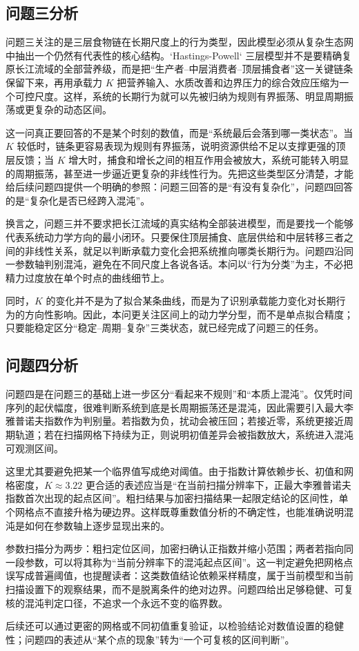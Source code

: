 \subsection{问题三分析}
问题三关注的是三层食物链在长期尺度上的行为类型，因此模型必须从复杂生态网中抽出一个仍然有代表性的核心结构。`Hastings-Powell` 三层模型并不是要精确复原长江流域的全部营养级，而是把“生产者--中层消费者--顶层捕食者”这一关键链条保留下来，再用承载力 \(K\) 把营养输入、水质改善和边界压力的综合效应压缩为一个可控尺度。这样，系统的长期行为就可以先被归纳为规则有界振荡、明显周期振荡或更复杂的动态区间。

这一问真正要回答的不是某个时刻的数值，而是“系统最后会落到哪一类状态”。当 \(K\) 较低时，链条更容易表现为规则有界振荡，说明资源供给不足以支撑更强的顶层反馈；当 \(K\) 增大时，捕食和增长之间的相互作用会被放大，系统可能转入明显的周期振荡，甚至进一步逼近更复杂的非线性行为。先把这些类型区分清楚，才能给后续问题四提供一个明确的参照：问题三回答的是“有没有复杂化”，问题四回答的是“复杂化是否已经跨入混沌”。

换言之，问题三并不要求把长江流域的真实结构全部装进模型，而是要找一个能够代表系统动力学方向的最小闭环。只要保住顶层捕食、底层供给和中层转移三者之间的非线性关系，就足以判断承载力变化会把系统推向哪类长期行为。问题四沿同一参数轴判别混沌，避免在不同尺度上各说各话。本问以“行为分类”为主，不必把精力过度放在单个时点的曲线细节上。

同时，\(K\) 的变化并不是为了拟合某条曲线，而是为了识别承载能力变化对长期行为的方向性影响。因此，本问更关注区间上的动力学分型，而不是单点拟合精度；只要能稳定区分“稳定--周期--复杂”三类状态，就已经完成了问题三的任务。

\subsection{问题四分析}
问题四是在问题三的基础上进一步区分“看起来不规则”和“本质上混沌”。仅凭时间序列的起伏幅度，很难判断系统到底是长周期振荡还是混沌，因此需要引入最大李雅普诺夫指数作为判别量。若指数为负，扰动会被压回；若接近零，系统更接近周期轨道；若在扫描网格下持续为正，则说明初值差异会被指数放大，系统进入混沌可观测区间。

这里尤其要避免把某一个临界值写成绝对阈值。由于指数计算依赖步长、初值和网格密度，\(K\approx 3.22\) 更合适的表述应当是“在当前扫描分辨率下，正最大李雅普诺夫指数首次出现的起点区间”。粗扫结果与加密扫描结果一起限定结论的区间性，单个网格点不直接升格为硬边界。这样既尊重数值分析的不确定性，也能准确说明混沌是如何在参数轴上逐步显现出来的。

参数扫描分为两步：粗扫定位区间，加密扫确认正指数并缩小范围；两者若指向同一段参数，可以将其称为“当前分辨率下的混沌起点区间”。这一判定避免把网格点误写成普遍阈值，也提醒读者：这类数值结论依赖采样精度，属于当前模型和当前扫描设置下的观察结果，而不是脱离条件的绝对边界。问题四给出足够稳健、可复核的混沌判定口径，不追求一个永远不变的临界数。

后续还可以通过更密的网格或不同初值重复验证，以检验结论对数值设置的稳健性；问题四的表述从“某个点的现象”转为“一个可复核的区间判断”。


